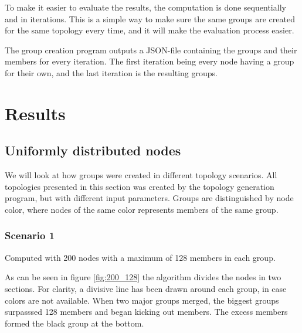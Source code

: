   To make it easier to evaluate the results, the computation is done sequentially
  and in iterations. This is a simple way to make sure the same groups are created
  for the same topology every time, and it will make the evaluation process easier. 

  The group creation program outputs a JSON-file containing the groups and their members for every iteration. The first iteration being every node having a group for their own,
  and the last iteration is the resulting groups.
  \section{Results}
  \subsection{Uniformly distributed nodes}
  We will look at how groups were created in different topology scenarios. 
  All topologies presented in this section was created by the topology generation program,
  but with different input parameters. Groups are distinguished by node color, where nodes
  of the same color represents members of the same group. 
  \subsubsection{Scenario 1}
  Computed with 200 nodes with a maximum of 128 members in each group.

  As can be seen in figure \ref{fig:200_128} the algorithm divides the nodes in two
  sections. For clarity, a divisive line has been drawn around each group,
  in case colors are not available.
  When two major groups merged, the biggest groups surpasssed 128 members and began
  kicking out members. The excess members formed the black group at the bottom. 

